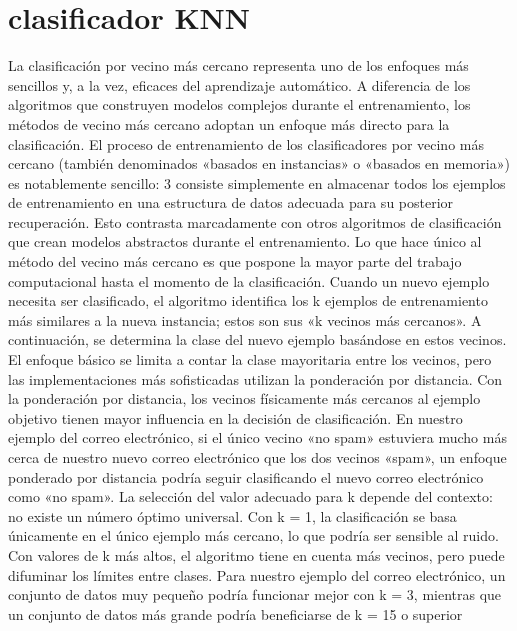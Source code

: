 \section{clasificador KNN}
La clasificación por vecino más cercano representa uno de los enfoques más sencillos y, a la
vez, eficaces del aprendizaje automático. A diferencia de los algoritmos que construyen modelos
complejos durante el entrenamiento, los métodos de vecino más cercano adoptan un enfoque más
directo para la clasificación. El proceso de entrenamiento de los clasificadores por vecino más cercano
(también denominados «basados en instancias» o «basados en memoria») es notablemente sencillo:
3 consiste simplemente en almacenar todos los ejemplos de entrenamiento en una estructura de
datos adecuada para su posterior recuperación. Esto contrasta marcadamente con otros algoritmos
de clasificación que crean modelos abstractos durante el entrenamiento. Lo que hace único al método
del vecino más cercano es que pospone la mayor parte del trabajo computacional hasta el momento
de la clasificación. Cuando un nuevo ejemplo necesita ser clasificado, el algoritmo identifica los
k ejemplos de entrenamiento más similares a la nueva instancia; estos son sus «k vecinos más
cercanos». A continuación, se determina la clase del nuevo ejemplo basándose en estos vecinos. El
enfoque básico se limita a contar la clase mayoritaria entre los vecinos, pero las implementaciones
más sofisticadas utilizan la ponderación por distancia. Con la ponderación por distancia, los vecinos
físicamente más cercanos al ejemplo objetivo tienen mayor influencia en la decisión de clasificación.
En nuestro ejemplo del correo electrónico, si el único vecino «no spam» estuviera mucho más
cerca de nuestro nuevo correo electrónico que los dos vecinos «spam», un enfoque ponderado por
distancia podría seguir clasificando el nuevo correo electrónico como «no spam». La selección del
valor adecuado para k depende del contexto: no existe un número óptimo universal. Con k = 1,
la clasificación se basa únicamente en el único ejemplo más cercano, lo que podría ser sensible al
ruido. Con valores de k más altos, el algoritmo tiene en cuenta más vecinos, pero puede difuminar
los límites entre clases. Para nuestro ejemplo del correo electrónico, un conjunto de datos muy
pequeño podría funcionar mejor con k = 3, mientras que un conjunto de datos más grande podría
beneficiarse de k = 15 o superior
